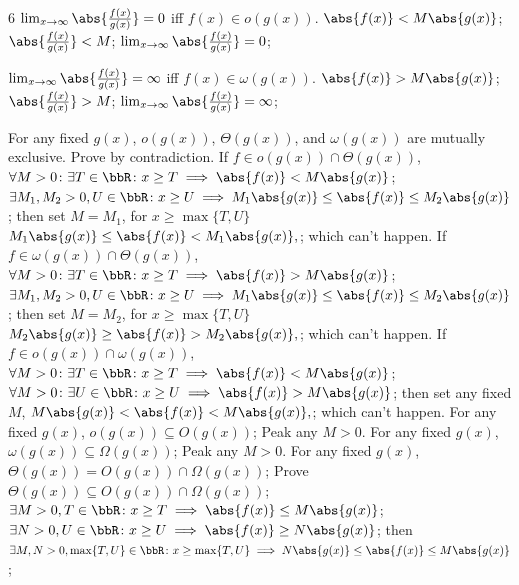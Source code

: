 \documentclass[a4paper,10pt]{extarticle}
\begin{document}
\begin{multicols}{6}
$\lim_{x\to\infty}\abs{\frac{f(x)}{g(x)}}=0$ iff $f(x)\in o(g(x))$.
\(\abs{f(x)}<M\abs{g(x)}\); 
\(\abs{\frac{f(x)}{g(x)}}<M\); 
\(\lim_{x\to\infty}\abs{\frac{f(x)}{g(x)}}=0\); 

$\lim_{x\to\infty}\abs{\frac{f(x)}{g(x)}}=\infty$ iff $f(x)\in \omega(g(x))$.
\(\abs{f(x)}>M\abs{g(x)}\); 
\(\abs{\frac{f(x)}{g(x)}}>M\); 
\(\lim_{x\to\infty}\abs{\frac{f(x)}{g(x)}}=\infty\); 


For any fixed $g(x)$, $o(g(x))$, $\Theta(g(x))$, and $\omega(g(x))$ are mutually exclusive.
\bpr
Prove by contradiction. If $f\in o(g(x))\cap\Theta(g(x))$,
\(\forall M>0\colon\exists T\in\bbR\colon x\ge T\implies\abs{f(x)}<M\abs{g(x)}\); 
\(\exists M_1,M_2>0,U\in\bbR\colon x\ge U\implies M_1\abs{g(x)}\le\abs{f(x)}\le M_2\abs{g(x)}\); 
then set $M=M_1$, for $x\ge\max\{T,U\}$
\(M_1\abs{g(x)}\le\abs{f(x)}<M_1\abs{g(x)},\); 
which can't happen. If $f\in \omega(g(x))\cap\Theta(g(x))$,
\(\forall M>0\colon\exists T\in\bbR\colon x\ge T\implies\abs{f(x)}>M\abs{g(x)}\); 
\(\exists M_1,M_2>0,U\in\bbR\colon x\ge U\implies M_1\abs{g(x)}\le\abs{f(x)}\le M_2\abs{g(x)}\); 
then set $M=M_2$, for $x\ge\max\{T,U\}$
\(M_2\abs{g(x)}\ge\abs{f(x)}>M_2\abs{g(x)},\); 
which can't happen. If $f\in o(g(x))\cap\omega(g(x))$,
\(\forall M>0\colon\exists T\in\bbR\colon x\ge T\implies\abs{f(x)}<M\abs{g(x)}\); 
\(\forall M>0\colon\exists U\in\bbR\colon x\ge U\implies\abs{f(x)}>M\abs{g(x)}\); 
then set any fixed $M$,
\(M\abs{g(x)}<\abs{f(x)}<M\abs{g(x)},\); 
which can't happen.
\epr
For any fixed $g(x)$,
\(o(g(x))\subseteq O(g(x))\); 
\bpr
Peak any $M>0$.
\epr
For any fixed $g(x)$,
\(\omega(g(x))\subseteq\Omega(g(x))\); 
\bpr
Peak any $M>0$.
\epr
For any fixed $g(x)$,
\(\Theta(g(x))=O(g(x))\cap\Omega(g(x))\); 
\bpr
Prove
\(\Theta(g(x))\subseteq O(g(x))\cap\Omega(g(x))\); 
\(\exists M>0,T\in\bbR\colon x\ge T\implies\abs{f(x)}\le M\abs{g(x)}\); 
\(\exists N>0,U\in\bbR\colon x\ge U\implies\abs{f(x)}\ge N\abs{g(x)}\); 
then
\(\exists M,N>0,\max\{T,U\}\in\bbR\colon x\ge \max\{T,U\}\implies N\abs{g(x)}\le\abs{f(x)}\le M\abs{g(x)}\); 


\end{multicols}
\end{document}

